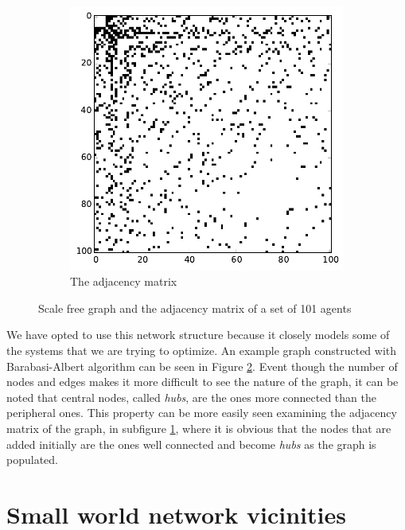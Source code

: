\begin{figure}[h]
\begin{subfigure}[b]{0.4\textwidth}
                \includegraphics[width=\textwidth]{images/topology/scale_free_barabasi_adjacency.pdf}
                \caption{The adjacency matrix}
                \label{subfig:scale free adjacency}
        \end{subfigure}
        \caption{Scale free graph and the adjacency matrix of a set of 101 agents}
        \label{fig:scale free adjacency graph}
\end{figure}

We have opted to use this network structure because it closely models some of the systems that we are trying to optimize.
An example graph constructed with Barabasi-Albert algorithm can be seen in Figure \ref{fig:scale free adjacency graph}.
Event though the number of nodes and edges makes it more difficult to see the nature of the graph, it can be noted that central nodes, called \textit{hubs}, are the ones more connected than the peripheral ones.
This property can be more easily seen examining the adjacency matrix of the graph, in subfigure \ref{subfig:scale free adjacency}, where it is obvious that the nodes that are added initially are the ones well connected and become \textit{hubs} as the graph is populated.

\section{Small world network vicinities}
\label{sec:small world}

